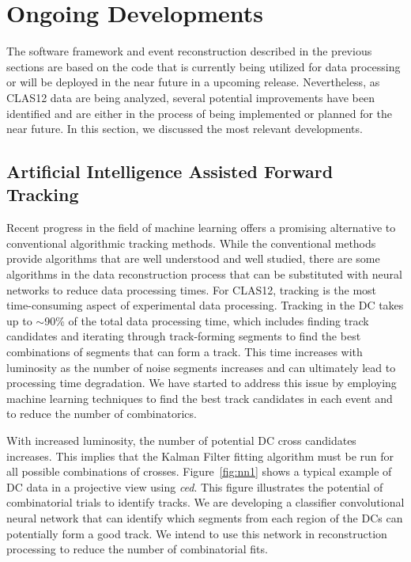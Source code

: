 \section{Ongoing Developments}

The software framework and event reconstruction described in the previous sections are based on the code that
is currently being utilized for data processing or will be deployed in the near future in a upcoming release.
Nevertheless, as CLAS12 data are being analyzed, several potential improvements have been identified and are
either in the process of being implemented or planned for the near future. In this section, we discussed the most
relevant developments.

\subsection{Artificial Intelligence Assisted Forward Tracking}

Recent progress in the field of machine learning offers a promising alternative to conventional algorithmic tracking
methods. While the conventional methods provide algorithms that are well understood and well studied, there are
some algorithms in the data reconstruction process that can be substituted with neural networks to reduce data
processing times. For CLAS12, tracking is the most time-consuming aspect of experimental data processing.
Tracking in the DC takes up to $\sim$90\% of the total data processing time, which includes finding track
candidates and iterating through track-forming segments to find the best combinations of segments that can form
a track. This time increases with luminosity as the number of noise segments increases and can ultimately lead to
processing time degradation. We have started to address this issue by employing machine learning techniques
to find the best track candidates in each event and to reduce the number of combinatorics.

With increased luminosity, the number of potential DC cross candidates increases. This implies that the Kalman
Filter fitting algorithm must be run for all possible combinations of crosses. Figure~\ref{fig:nn1} shows a typical
example of DC data in a projective view using {\it ced}. This figure illustrates the potential of combinatorial trials
to identify tracks. We are developing a classifier convolutional neural network that can identify which segments
from each region of the DCs can potentially form a good track. We intend to use this network in reconstruction
processing to reduce the number of combinatorial fits.

